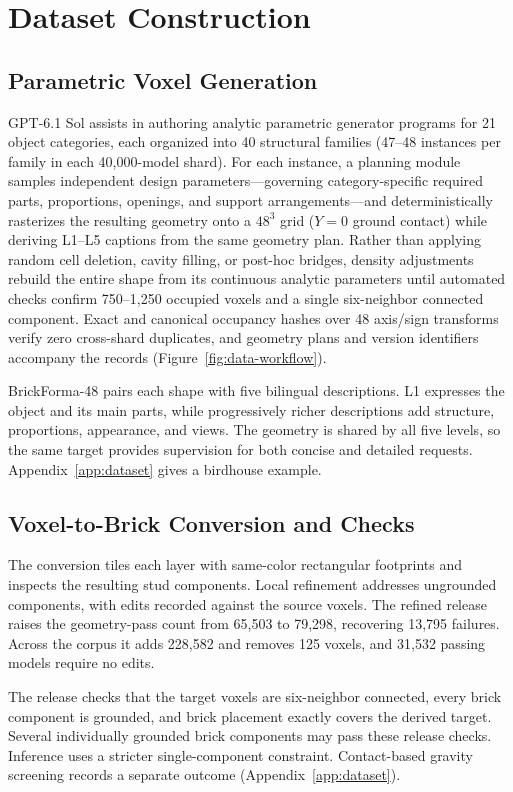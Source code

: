 \documentclass[letterpaper]{article} %
\begin{document}
\section{Dataset Construction}
\label{sec:dataset}
\subsection{Parametric Voxel Generation}
GPT-6.1 Sol assists in authoring analytic parametric generator programs for 21 object categories, each organized into 40 structural families (47--48 instances per family in each 40,000-model shard). For each instance, a planning module samples independent design parameters---governing category-specific required parts, proportions, openings, and support arrangements---and deterministically rasterizes the resulting geometry onto a $48^3$ grid ($Y{=}0$ ground contact) while deriving L1--L5 captions from the same geometry plan. Rather than applying random cell deletion, cavity filling, or post-hoc bridges, density adjustments rebuild the entire shape from its continuous analytic parameters until automated checks confirm 750--1,250 occupied voxels and a single six-neighbor connected component. Exact and canonical occupancy hashes over 48 axis/sign transforms verify zero cross-shard duplicates, and geometry plans and version identifiers accompany the records (Figure~\ref{fig:data-workflow}). %

BrickForma-48 pairs each shape with five bilingual descriptions. L1 expresses the object and its main parts, while progressively richer descriptions add structure, proportions, appearance, and views. The geometry is shared by all five levels, so the same target provides supervision for both concise and detailed requests. Appendix~\ref{app:dataset} gives a birdhouse example.

\subsection{Voxel-to-Brick Conversion and Checks}
The conversion tiles each layer with same-color rectangular footprints and inspects the resulting stud components. Local refinement addresses ungrounded components, %
 with edits recorded against the source voxels. The refined release raises the geometry-pass count from 65,503 to 79,298, recovering 13,795 failures. Across the corpus it adds 228,582 and removes 125 voxels, and 31,532 passing models require no edits.

The release checks that the target voxels are six-neighbor connected, every brick component is grounded, and brick placement exactly covers the derived target. Several individually grounded brick components may pass these release checks. Inference uses a stricter single-component constraint. Contact-based gravity screening records a separate outcome (Appendix~\ref{app:dataset}).
\end{document}

